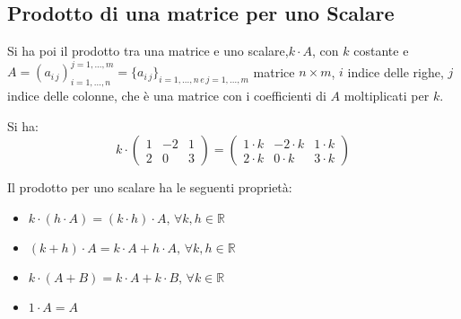 \documentclass[a4paper,12pt, oneside]{book}
\begin{document}
\subsection{Prodotto di una matrice per uno Scalare}
Si ha poi il prodotto tra una matrice e uno scalare,$k\cdot A$, con $k$ costante e $A=(a_{i\,j})_{i=1,...,n}^{j=1,...,m}=\{a_{i\,j}\}_{i=1,...,n\, e \, j=1,...,m}$ matrice $n\times m$, $i$ indice delle righe, $j$ indice delle colonne, che è una matrice con i coefficienti di $A$ moltiplicati per $k$.
\begin{esempio}
	Si ha:\\
	$$k\cdot\left(\begin{matrix}
			1 & -2 & 1 \\
			2 & 0  & 3
		\end{matrix}\right)=
		\left(\begin{matrix}
			1\cdot k & -2\cdot k & 1\cdot k \\
			2\cdot k & 0\cdot k  & 3\cdot k
		\end{matrix}\right)$$
\end{esempio}
Il prodotto per uno scalare ha le seguenti proprietà:
\begin{itemize}
	\item $k\cdot(h\cdot A)=(k\cdot h)\cdot A,\, \forall k,h\in \mathbb{R}$
	\item $(k+h)\cdot A=k\cdot A+ h\cdot A,\, \forall k,h\in \mathbb{R}$
	\item $k\cdot(A+B)=k\cdot A+k\cdot B,\, \forall k\in \mathbb{R}$
	\item $1\cdot A=A$
\end{itemize}
\end{document}
